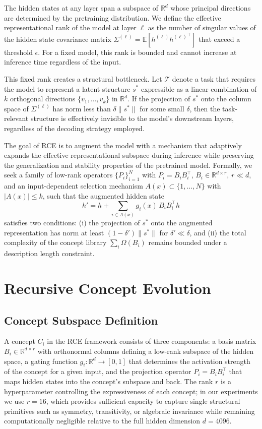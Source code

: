 \documentclass[11pt]{article}
\begin{document}
The hidden states at any layer span a subspace of $\mathbb{R}^d$ whose principal directions are determined by the pretraining distribution. We define the effective representational rank of the model at layer $\ell$ as the number of singular values of the hidden state covariance matrix $\Sigma^{(\ell)} = \mathbb{E}[h^{(\ell)} {h^{(\ell)}}^\top]$ that exceed a threshold $\epsilon$. For a fixed model, this rank is bounded and cannot increase at inference time regardless of the input.

This fixed rank creates a structural bottleneck. Let $\mathcal{T}$ denote a task that requires the model to represent a latent structure $s^*$ expressible as a linear combination of $k$ orthogonal directions $\{v_1, \ldots, v_k\}$ in $\mathbb{R}^d$. If the projection of $s^*$ onto the column space of $\Sigma^{(\ell)}$ has norm less than $\delta \|s^*\|$ for some small $\delta$, then the task-relevant structure is effectively invisible to the model's downstream layers, regardless of the decoding strategy employed.

The goal of RCE is to augment the model with a mechanism that adaptively expands the effective representational subspace during inference while preserving the generalization and stability properties of the pretrained model. Formally, we seek a family of low-rank operators $\{P_i\}_{i=1}^N$ with $P_i = B_i B_i^\top$, $B_i \in \mathbb{R}^{d \times r}$, $r \ll d$, and an input-dependent selection mechanism $A(x) \subset \{1, \ldots, N\}$ with $|A(x)| \leq k$, such that the augmented hidden state
\begin{equation}
h' = h + \sum_{i \in A(x)} g_i(x)\, B_i B_i^\top h
\label{eq:injection}
\end{equation}
satisfies two conditions: (i) the projection of $s^*$ onto the augmented representation has norm at least $(1-\delta')\|s^*\|$ for $\delta' \ll \delta$, and (ii) the total complexity of the concept library $\sum_i \Omega(B_i)$ remains bounded under a description length constraint.

\section{Recursive Concept Evolution}

\subsection{Concept Subspace Definition}

A concept $C_i$ in the RCE framework consists of three components: a basis matrix $B_i \in \mathbb{R}^{d \times r}$ with orthonormal columns defining a low-rank subspace of the hidden space, a gating function $g_i: \mathbb{R}^d \to [0,1]$ that determines the activation strength of the concept for a given input, and the projection operator $P_i = B_i B_i^\top$ that maps hidden states into the concept's subspace and back. The rank $r$ is a hyperparameter controlling the expressiveness of each concept; in our experiments we use $r = 16$, which provides sufficient capacity to capture single structural primitives such as symmetry, transitivity, or algebraic invariance while remaining computationally negligible relative to the full hidden dimension $d = 4096$.
\end{document}
